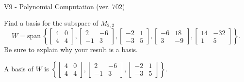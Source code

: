 \begin{exercise}
  \begin{exerciseTitle}V9 - Polynomial Computation (ver. 702)\end{exerciseTitle}
  \begin{exerciseStatement}
    Find a basis for the subspace of \(M_{2,2}\) 
\[W=\mathrm{span}\ \left\{\left[\begin{array}{cc}
4 & 0 \\
4 & 4
\end{array}\right] , \left[\begin{array}{cc}
2 & -6 \\
-1 & 3
\end{array}\right] , \left[\begin{array}{cc}
-2 & 1 \\
-3 & 5
\end{array}\right] , \left[\begin{array}{cc}
-6 & 18 \\
3 & -9
\end{array}\right] , \left[\begin{array}{cc}
14 & -32 \\
1 & 5
\end{array}\right]\right\}.\]
 Be sure to explain why your result is a basis.


  \end{exerciseStatement}
  \begin{exerciseAnswer}
   A basis of \(W\) is  \(\left\{\left[\begin{array}{cc}
4 & 0 \\
4 & 4
\end{array}\right] , \left[\begin{array}{cc}
2 & -6 \\
-1 & 3
\end{array}\right] , \left[\begin{array}{cc}
-2 & 1 \\
-3 & 5
\end{array}\right]\right\}\).
  


  \end{exerciseAnswer}
\end{exercise}